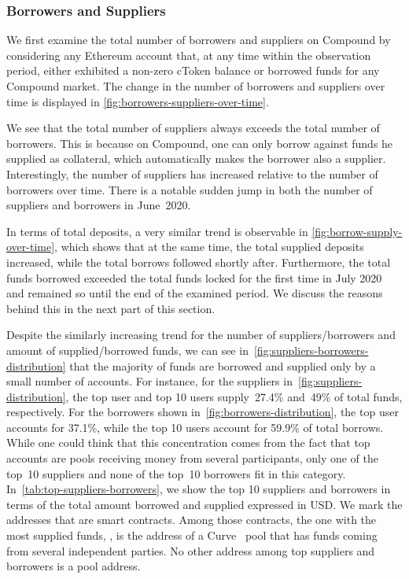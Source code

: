 \subsubsection{Borrowers and Suppliers}
We first examine the total number of borrowers and suppliers on Compound by considering any Ethereum account that, at any time within the observation period, either exhibited a non-zero cToken balance or borrowed funds for any Compound market.
The change in the number of borrowers and suppliers over time is displayed in \autoref{fig:borrowers-suppliers-over-time}.

We see that the total number of suppliers always exceeds the total number of borrowers.
This is because on Compound, one can only borrow against funds he supplied as collateral, which automatically makes the borrower also a supplier.
Interestingly, the number of suppliers has increased relative to the number of borrowers over time.
There is a notable sudden jump in both the number of suppliers and borrowers in June~2020.

In terms of total deposits, a very similar trend is observable in \autoref{fig:borrow-supply-over-time}, which shows that at the same time, the total supplied deposits increased, while the total borrows followed shortly after.
Furthermore, the total funds borrowed exceeded the total funds locked for the first time in July 2020 and remained so until the end of the examined period.
We discuss the reasons behind this in the next part of this section.

Despite the similarly increasing trend for the number of suppliers/borrowers and amount of supplied/borrowed funds, we can see in~\autoref{fig:suppliers-borrowers-distribution} that the majority of funds are borrowed and supplied only by a small number of accounts.
For instance, for the suppliers in~\autoref{fig:suppliers-distribution}, the top user and top 10 users supply~27.4\% and~49\% of total funds, respectively.
For the borrowers shown in~\autoref{fig:borrowers-distribution}, the top user accounts for 37.1\%, while the top 10 users account for 59.9\% of total borrows.
While one could think that this concentration comes from the fact that top accounts are pools receiving money from several participants, only one of the top~10 suppliers and none of the top~10 borrowers fit in this category.
In~\autoref{tab:top-suppliers-borrowers}, we show the top 10 suppliers and borrowers in terms of the total amount borrowed and supplied expressed in USD.
We mark the addresses that are smart contracts. Among those contracts, the one with the most supplied funds, , is the address of a Curve~\cite{web:curve} pool that has funds coming from several independent parties.
No other address among top suppliers and borrowers is a pool address.


